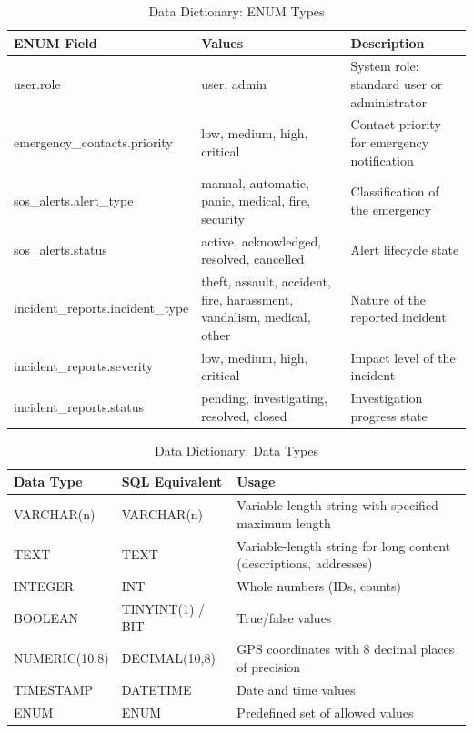 \begin{table}[H]
  \centering
  \caption{Data Dictionary: ENUM Types}
  \label{tab:data-dict}
  \begin{tabularx}{\textwidth}{@{}l l X@{}}
    \toprule
    \textbf{ENUM Field} & \textbf{Values} & \textbf{Description} \\
    \midrule
    user.role & user, admin & System role: standard user or administrator \\
    emergency\_contacts.priority & low, medium, high, critical & Contact priority for emergency notification \\
    sos\_alerts.alert\_type & manual, automatic, panic, medical, fire, security & Classification of the emergency \\
    sos\_alerts.status & active, acknowledged, resolved, cancelled & Alert lifecycle state \\
    incident\_reports.incident\_type & theft, assault, accident, fire, harassment, vandalism, medical, other & Nature of the reported incident \\
    incident\_reports.severity & low, medium, high, critical & Impact level of the incident \\
    incident\_reports.status & pending, investigating, resolved, closed & Investigation progress state \\
    \bottomrule
  \end{tabularx}
\end{table}

\begin{table}[H]
  \centering
  \caption{Data Dictionary: Data Types}
  \label{tab:data-types}
  \begin{tabularx}{\textwidth}{@{}l l X@{}}
    \toprule
    \textbf{Data Type} & \textbf{SQL Equivalent} & \textbf{Usage} \\
    \midrule
    VARCHAR(n) & VARCHAR(n) & Variable-length string with specified maximum length \\
    TEXT & TEXT & Variable-length string for long content (descriptions, addresses) \\
    INTEGER & INT & Whole numbers (IDs, counts) \\
    BOOLEAN & TINYINT(1) / BIT & True/false values \\
    NUMERIC(10,8) & DECIMAL(10,8) & GPS coordinates with 8 decimal places of precision \\
    TIMESTAMP & DATETIME & Date and time values \\
    ENUM & ENUM & Predefined set of allowed values \\
    \bottomrule
  \end{tabularx}
\end{table}

